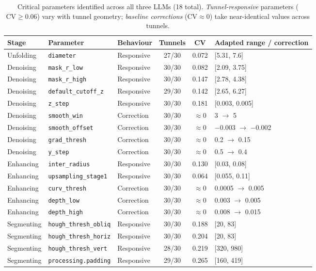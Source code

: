 \documentclass[a4paper,fleqn]{cas-dc}
\begin{document}
{\begin{table}[t]
\caption{Critical parameters identified across all three LLMs (18 total). \emph{Tunnel-responsive} parameters ($\text{CV} \geq 0.06$) vary with tunnel geometry; \emph{baseline corrections} ($\text{CV} \approx 0$) take near-identical values across tunnels.}\label{tab:critical-params}
\begin{tabular*}{\textwidth}{@{\extracolsep{\fill}} l l l c c l @{}}
\toprule
Stage & Parameter & Behaviour & Tunnels & CV & Adapted range / correction \\
\midrule
Unfolding & \texttt{diameter} & Responsive & 27/30 & 0.072 & [5.31, 7.6] \\
\midrule
Denoising & \texttt{mask\_r\_low} & Responsive & 30/30 & 0.082 & [2.09, 3.75] \\
Denoising & \texttt{mask\_r\_high} & Responsive & 30/30 & 0.147 & [2.78, 4.38] \\
Denoising & \texttt{default\_cutoff\_z} & Responsive & 29/30 & 0.142 & [2.65, 6.27] \\
Denoising & \texttt{z\_step} & Responsive & 30/30 & 0.181 & [0.003, 0.005] \\
Denoising & \texttt{smooth\_win} & Correction & 30/30 & $\approx$0 & 3 $\rightarrow$ 5 \\
Denoising & \texttt{smooth\_offset} & Correction & 30/30 & $\approx$0 & $-$0.003 $\rightarrow$ $-$0.002 \\
Denoising & \texttt{grad\_thresh} & Correction & 30/30 & $\approx$0 & 0.2 $\rightarrow$ 0.15 \\
Denoising & \texttt{y\_step} & Correction & 30/30 & $\approx$0 & 0.5 $\rightarrow$ 0.4 \\
\midrule
Enhancing & \texttt{inter\_radius} & Responsive & 30/30 & 0.130 & [0.03, 0.08] \\
Enhancing & \texttt{upsampling\_stage1} & Responsive & 30/30 & 0.064 & [0.055, 0.11] \\
Enhancing & \texttt{curv\_thresh} & Correction & 30/30 & $\approx$0 & 0.0005 $\rightarrow$ 0.005 \\
Enhancing & \texttt{depth\_low} & Correction & 30/30 & $\approx$0 & 0.003 $\rightarrow$ 0.005 \\
Enhancing & \texttt{depth\_high} & Correction & 30/30 & $\approx$0 & 0.008 $\rightarrow$ 0.015 \\
\midrule
Segmenting & \texttt{hough\_thresh\_obliq} & Responsive & 30/30 & 0.188 & [20, 83] \\
Segmenting & \texttt{hough\_thresh\_horiz} & Responsive & 30/30 & 0.204 & [20, 83] \\
Segmenting & \texttt{hough\_thresh\_vert} & Responsive & 28/30 & 0.219 & [320, 980] \\
Segmenting & \texttt{processing.padding} & Responsive & 29/30 & 0.265 & [160, 419] \\
\bottomrule
\end{tabular*}
\end{table}



}
\end{document}
